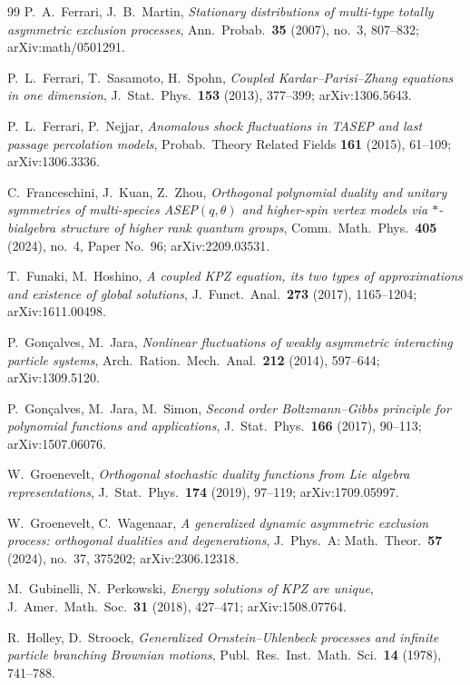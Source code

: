 \begin{thebibliography}{99}
 P.~A.~Ferrari, J.~B.~Martin, \emph{Stationary distributions
of multi-type totally asymmetric exclusion processes}, Ann.~Probab.~\textbf{35}
(2007), no.~3, 807--832; arXiv:math/0501291.

 P.~L.~Ferrari, T.~Sasamoto, H.~Spohn, \emph{Coupled
Kardar--Parisi--Zhang equations in one dimension}, J.~Stat.~Phys.~\textbf{153}
(2013), 377--399; arXiv:1306.5643.

 P.~L.~Ferrari, P.~Nejjar, \emph{Anomalous shock
fluctuations in TASEP and last passage percolation models}, Probab.~Theory
Related Fields \textbf{161} (2015), 61--109; arXiv:1306.3336.

 C.~Franceschini, J.~Kuan, Z.~Zhou, \emph{Orthogonal polynomial duality
and unitary symmetries of multi-species ASEP$(q,\theta)$ and higher-spin vertex
models via $\ast$-bialgebra structure of higher rank quantum groups},
Comm.~Math.~Phys.~\textbf{405} (2024), no.~4, Paper No.~96; arXiv:2209.03531.

 T.~Funaki, M.~Hoshino, \emph{A coupled KPZ equation, its
two types of approximations and existence of global solutions},
J.~Funct.~Anal.~\textbf{273} (2017), 1165--1204; arXiv:1611.00498.

 P.~Gon\c{c}alves, M.~Jara, \emph{Nonlinear fluctuations of weakly asymmetric
interacting particle systems}, Arch.~Ration.~Mech.~Anal.~\textbf{212} (2014), 597--644;
arXiv:1309.5120.

 P.~Gon\c{c}alves, M.~Jara, M.~Simon, \emph{Second order Boltzmann--Gibbs
principle for polynomial functions and applications}, J.~Stat.~Phys.~\textbf{166} (2017),
90--113; arXiv:1507.06076.

 W.~Groenevelt, \emph{Orthogonal stochastic duality functions from Lie
algebra representations}, J.~Stat.~Phys.~\textbf{174} (2019), 97--119; arXiv:1709.05997.

 W.~Groenevelt, C.~Wagenaar, \emph{A generalized dynamic
asymmetric exclusion process: orthogonal dualities and degenerations},
J.~Phys.~A: Math.~Theor.~\textbf{57} (2024), no.~37, 375202; arXiv:2306.12318.

 M.~Gubinelli, N.~Perkowski, \emph{Energy solutions of KPZ are unique},
J.~Amer.~Math.~Soc.~\textbf{31} (2018), 427--471; arXiv:1508.07764.

 R.~Holley, D.~Stroock, \emph{Generalized Ornstein--Uhlenbeck
processes and infinite particle branching Brownian motions},
Publ.~Res.~Inst.~Math.~Sci.~\textbf{14} (1978), 741--788.


\end{thebibliography}
